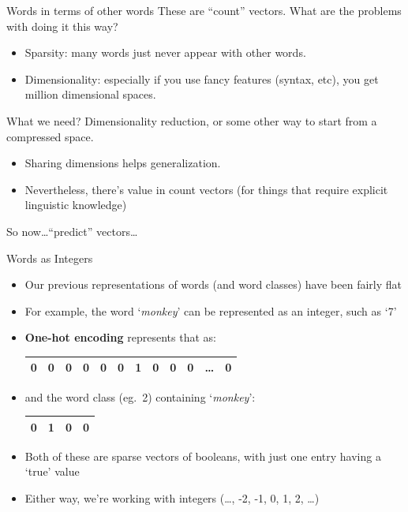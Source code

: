 \documentclass[xcolor=pdftex,x11names,table,hyperref]{beamer}
\begin{document}
\begin{frame}{Words in terms of other words}
  These are ``count'' vectors. 
  What are the problems with doing it this way?\pause
  \begin{itemize}
    \item Sparsity: many words just never appear with other words.\pause
    \item Dimensionality: especially if you use fancy features (syntax, etc),
      you get million dimensional spaces.\pause
  \end{itemize}
  What we need? Dimensionality reduction, or some other way to start
  from a compressed space.\pause
  \begin{itemize}
  \item Sharing dimensions helps generalization.\pause
  \item Nevertheless, there's value in count vectors (for things that require explicit linguistic knowledge)\pause
  \end{itemize}
  So now\ldots ``predict'' vectors\ldots
\end{frame}

\begin{frame}{Words as Integers}
\begin{itemize}
	\item Our previous representations of words (and word classes) have been fairly flat
	\item For example, the word `\textit{monkey}' can be represented as an integer, such as `7'
	\pause
	\item \textbf{One-hot encoding} represents that as: \\[0.4em]
		\begin{tabular}{|c|c|c|c|c|c|c|c|c|c|c|c|}
		    \hline
			0 & 0 & 0 & 0 & 0 & 0 & 1 & 0 & 0 & 0 & \ldots & 0 \\
		    \hline
		\end{tabular}
	\pause

\item and the word class (eg.\ 2) containing `\textit{monkey}': \\[0.4em]
		\begin{tabular}{|c|c|c|c|}
		    \hline
			0 & 1 & 0 & 0 \\
		    \hline
		\end{tabular}

	\pause
	\item Both of these are sparse vectors of booleans, with just one entry having a `true' value
	\pause
	\item Either way, we're working with integers {\small (\ldots, -2, -1, 0, 1, 2, \ldots)}
\end{itemize}
\end{frame}
\end{document}
